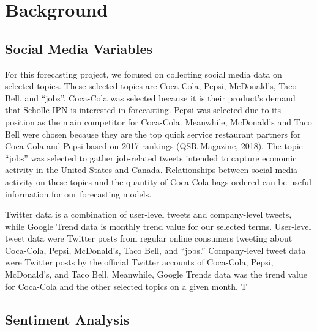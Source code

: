 \documentclass[12pt,oneside]{chicagocapstone}
\begin{document}
\hypertarget{background}{%
\chapter*{Background}\label{background}}

\hypertarget{social-media-variables}{%
\section*{Social Media Variables}\label{social-media-variables}}

For this forecasting project, we focused on collecting social media data on selected topics. These selected topics are Coca-Cola, Pepsi, McDonald's, Taco Bell, and ``jobs''. Coca-Cola was selected because it is their product's demand that Scholle IPN is interested in forecasting. Pepsi was selected due to its position as the main competitor for Coca-Cola. Meanwhile, McDonald's and Taco Bell were chosen because they are the top quick service restaurant partners for Coca-Cola and Pepsi based on 2017 rankings (QSR Magazine, 2018). The topic ``jobs'' was selected to gather job-related tweets intended to capture economic activity in the United States and Canada. Relationships between social media activity on these topics and the quantity of Coca-Cola bags ordered can be useful information for our forecasting models.

Twitter data is a combination of user-level tweets and company-level tweets, while Google Trend data is monthly trend value for our selected terms. User-level tweet data were Twitter posts from regular online consumers tweeting about Coca-Cola, Pepsi, McDonald's, Taco Bell, and ``jobs.'' Company-level tweet data were Twitter posts by the official Twitter accounts of Coca-Cola, Pepsi, McDonald's, and Taco Bell. Meanwhile, Google Trends data was the trend value for Coca-Cola and the other selected topics on a given month. T

\hypertarget{sentiment-analysis}{%
\section*{Sentiment Analysis}\label{sentiment-analysis}}
\end{document}
